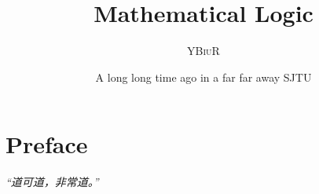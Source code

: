 \documentclass[oneside]{book}
\title{Mathematical Logic}
\author{\textsc{YBiuR}}
\date{A long long time ago in a far far away SJTU}
\theoremstyle{definition}
\theoremstyle{remark}
\begin{document}
\setlength{\parskip}{1em}
\setlength{\parindent}{0em}

\frontmatter
\maketitle
\chapter*{Preface}
\emph{“道可道，非常道。”}

\mainmatter
\tableofcontents
\begin{spacing}{1.2}




\end{spacing}
\end{document}
